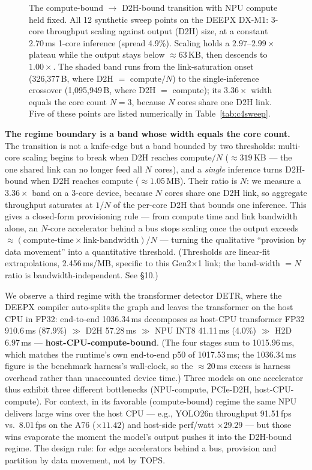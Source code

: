 \documentclass[11pt]{article}
\begin{document}
\begin{figure}[htbp]
\begin{tikzpicture}[x=1cm,y=1cm]
\end{tikzpicture}
\caption{The compute-bound $\to$ D2H-bound transition with NPU compute held fixed. All 12 synthetic sweep points on the DEEPX DX-M1: 3-core throughput scaling against output (D2H) size, at a constant 2.70\,ms 1-core inference (spread 4.9\%). Scaling holds a $2.97$--$2.99\times$ plateau while the output stays below ${\approx}63$\,KB, then descends to $1.00\times$. The shaded band runs from the link-saturation onset (326{,}377\,B, where D2H $=$ compute$/N$) to the single-inference crossover (1{,}095{,}949\,B, where D2H $=$ compute); its $3.36\times$ width equals the core count $N=3$, because $N$ cores share one D2H link. Five of these points are listed numerically in Table~\ref{tab:c4sweep}.}
\label{fig:c4}
\end{figure}

\textbf{The regime boundary is a band whose width equals the core count.} The transition is not a knife-edge but a band bounded by two thresholds: multi-core scaling begins to break when D2H reaches compute$/N$ (${\approx}319$\,KB --- the one shared link can no longer feed all $N$ cores), and a \emph{single} inference turns D2H-bound when D2H reaches compute (${\approx}1.05$\,MB). Their ratio is $N$: we measure a $3.36\times$ band on a 3-core device, because $N$ cores share one D2H link, so aggregate throughput saturates at $1/N$ of the per-core D2H that bounds one inference. This gives a closed-form provisioning rule --- from compute time and link bandwidth alone, an $N$-core accelerator behind a bus stops scaling once the output exceeds ${\approx}(\text{compute-time} \times \text{link-bandwidth})/N$ --- turning the qualitative ``provision by data movement'' into a quantitative threshold. (Thresholds are linear-fit extrapolations, 2.456\,ms/MB, specific to this Gen2$\times$1 link; the band-width $=N$ ratio is bandwidth-independent. See \S10.)

We observe a third regime with the transformer detector DETR, where the DEEPX compiler auto-splits the graph and leaves the transformer on the host CPU in FP32: end-to-end 1036.34\,ms decomposes as host-CPU transformer FP32 910.6\,ms (87.9\%) $\gg$ D2H 57.28\,ms $\gg$ NPU INT8 41.11\,ms (4.0\%) $\gg$ H2D 6.97\,ms --- \textbf{host-CPU-compute-bound}. (The four stages sum to 1015.96\,ms, which matches the runtime's own end-to-end p50 of 1017.53\,ms; the 1036.34\,ms figure is the benchmark harness's wall-clock, so the ${\approx}20$\,ms excess is harness overhead rather than unaccounted device time.) Three models on one accelerator thus exhibit three different bottlenecks (NPU-compute, PCIe-D2H, host-CPU-compute). For context, in its favorable (compute-bound) regime the same NPU delivers large wins over the host CPU --- e.g., YOLO26n throughput 91.51\,fps vs.\ 8.01\,fps on the A76 ($\times11.42$) and host-side perf/watt $\times29.29$ --- but those wins evaporate the moment the model's output pushes it into the D2H-bound regime. The design rule: for edge accelerators behind a bus, provision and partition by data movement, not by TOPS.
\end{document}
